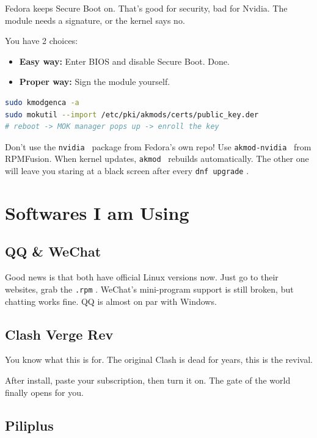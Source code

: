 \documentclass[lang=en,color=blue,12pt]{elegantbook}
\let\oldtexttt\texttt
\renewcommand{\texttt}[1]{%
  \begingroup
  \setlength{\fboxsep}{1pt}%
  \colorbox{gray!10}{\oldtexttt{#1}}%
  \endgroup
}
\begin{document}
Fedora keeps Secure Boot on. That's good for security, bad for Nvidia.
The module needs a signature, or the kernel says no.

You have 2 choices:

\begin{itemize}[itemsep=0pt, parsep=0pt, topsep=0pt, partopsep=0pt]
\item \textbf{Easy way:} Enter BIOS and disable Secure Boot. Done.
\item \textbf{Proper way:} Sign the module yourself.
\end{itemize}

\begin{lstlisting}[language=bash]
sudo kmodgenca -a
sudo mokutil --import /etc/pki/akmods/certs/public_key.der
# reboot -> MOK manager pops up -> enroll the key
\end{lstlisting}

\begin{warning*}
Don't use the \texttt{nvidia}\ package from Fedora's own repo!
Use \texttt{akmod-nvidia}\ from RPMFusion. When kernel updates,
\texttt{akmod}\ rebuilds automatically. The other one will leave you
staring at a black screen after every \texttt{dnf\ upgrade}.
\end{warning*}

\section{Softwares I am Using}

\subsection{QQ \& WeChat}

Good news is that both have official Linux versions now. Just go to their
websites, grab the \texttt{.rpm}. WeChat's mini-program
support is still broken, but chatting works fine. QQ is almost
on par with Windows.

\subsection{Clash Verge Rev}

You know what this is for. The original Clash is dead for years, this is the
revival.

After install, paste your subscription, then turn it on. The gate of the world
finally opens for you.

\subsection{Piliplus}
\end{document}

